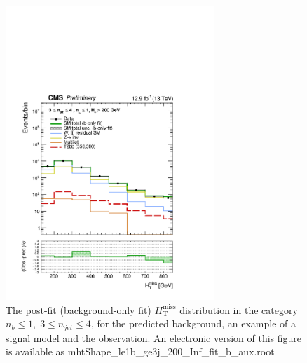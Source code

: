 \begin{figure}[tbhp]
    \caption{ 
    The post-fit (background-only fit) $H_{\mathrm{T}}^{\mathrm{miss}}$ distribution in the category $n_{b}\leq 1, \; 3 \leq n_{jet} \leq 4$, 
    for the predicted background, an example of a signal model and the observation.
    An electronic version of this figure is available as mhtShape\_le1b\_ge3j\_200\_Inf\_fit\_b\_aux.root
    \label{fig:mhtShape_le1b_ge3j_fit_b} }
  \begin{center}
  \includegraphics[width=0.7\textwidth]{mhtShape_le1b_ge3j_200_Inf_fit_b_aux}
  \end{center}
\end{figure}


